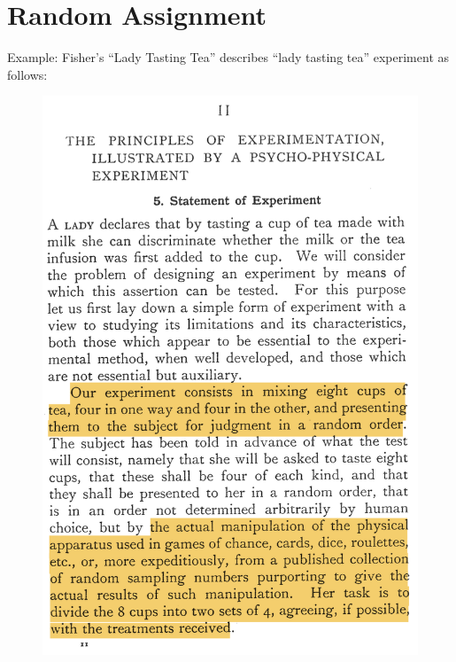 \documentclass[table, xcolor = {dvipsnames}, 9pt]{beamer}
\theoremstyle{plain}
\begin{document}
\section{Random Assignment}
\begin{frame}{Example: Fisher's ``Lady Tasting Tea''}
\vfill
\citet[][p.~11]{fisher1935a} describes ``lady tasting tea'' experiment as follows:
\vspace{-1em}
\begin{figure}[H]
\includegraphics[width=0.5\linewidth]{images/fisher_lady_tasting_tea_text.png}
\end{figure} \vfill
\end{frame}
\end{document}
